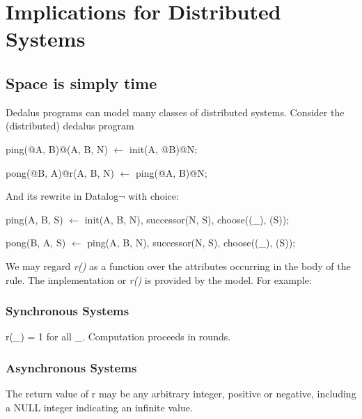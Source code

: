 \section{Implications for Distributed Systems}

\subsection{Space is simply time}

Dedalus programs can model many classes of distributed systems.  Consider the (distributed) dedalus program

\begin{Dedalus}
ping(@A, B)@(A, B, N) \(\leftarrow\)
  init(A, @B)@N; 

pong(@B, A)@r(A, B, N) \(\leftarrow\)
  ping(@A, B)@N;
\end{Dedalus}

And its rewrite in Datalog$\lnot$ with choice:

\begin{Dedalus}
ping(A, B, S) \(\leftarrow\)
  init(A, B, N),
  successor(N, S),
  choose((_), (S));

pong(B, A, S) \(\leftarrow\)
  ping(A, B, N),
  successor(N, S),
  choose((_), (S));
  
\end{Dedalus}

We may regard  \emph{r()} as a function over the attributes occurring in the body of the rule.   The implementation or \emph{r()} is provided by
the model.  For example:

\subsubsection{Synchronous Systems}

r(\_) = 1 for all \_.  Computation proceeds in rounds.

\subsubsection{Asynchronous Systems}

The return value of r may be any arbitrary integer, positive or negative, including a NULL integer indicating an infinite value.


